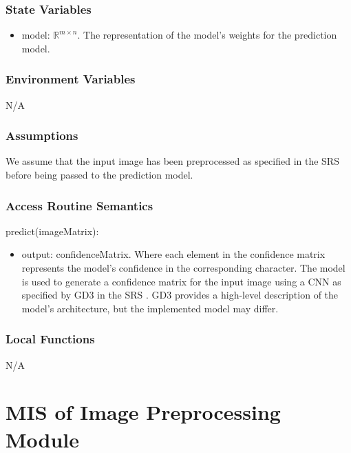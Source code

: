 \documentclass[12pt, titlepage]{article}
\begin{document}
\subsubsection{State Variables}

\begin{itemize}
  \item model: $\mathbb{R}^{m \times n}$. The representation of the model's
  weights for the prediction model.
\end{itemize}

\subsubsection{Environment Variables}

N/A

\subsubsection{Assumptions}

We assume that the input image has been preprocessed as specified in the SRS
before being passed to the prediction model.


\subsubsection{Access Routine Semantics}

\noindent predict(imageMatrix):
\begin{itemize}
\item output: confidenceMatrix. Where each element in the confidence matrix
represents the model's confidence in the corresponding character. The model is
used to generate a confidence matrix for the input image using a CNN as
specified by GD3 in the SRS \cite[4.2.3]{SRS}. GD3 provides a high-level
description of the model's architecture, but the implemented model may differ.
\end{itemize}


\subsubsection{Local Functions}

N/A

\section{MIS of Image Preprocessing Module} \label{mPreprocessing}
\end{document}
